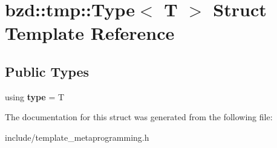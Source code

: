 \hypertarget{structbzd_1_1tmp_1_1Type}{}\section{bzd\+:\+:tmp\+:\+:Type$<$ T $>$ Struct Template Reference}
\label{structbzd_1_1tmp_1_1Type}
\subsection*{Public Types}
\begin{DoxyCompactItemize}
\item 
\mbox{\label{structbzd_1_1tmp_1_1Type_ada33b4b234ad9d069b6c9e2236f53f2a}} 
using {\bfseries type} = T
\end{DoxyCompactItemize}


The documentation for this struct was generated from the following file\+:\begin{DoxyCompactItemize}
\item 
include/template\+\_\+metaprogramming.\+h\end{DoxyCompactItemize}
